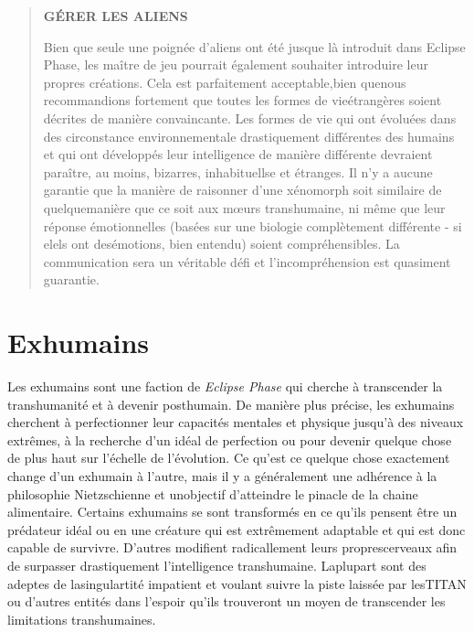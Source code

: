 \begin{quotation} \begin{large} \textbf{GÉRER LES ALIENS} \end{large} 

Bien que seule une poignée d'aliens ont été jusque là introduit dans Eclipse Phase, les maître de jeu pourrait également souhaiter introduire leur propres créations. Cela est parfaitement acceptable,bien quenous recommandions fortement que toutes les formes de vieétrangères soient décrites de manière convaincante. Les formes de vie qui ont évoluées dans des circonstance environnementale drastiquement différentes des humains et qui ont développés leur intelligence de manière différente devraient paraître, au moins, bizarres, inhabituellse et étranges. Il n'y a aucune garantie que la manière de raisonner d'une xénomorph  soit similaire de quelquemanière que ce soit aux mœurs transhumaine, ni même que leur réponse émotionnelles (basées sur une biologie complètement différente - si elels ont desémotions, bien entendu) soient compréhensibles. La communication sera un véritable défi et l'incompréhension est quasiment guarantie. \end{quotation} 

\section{Exhumains } 

Les exhumains sont une faction de \textit{Eclipse Phase} qui cherche à transcender la transhumanité et à devenir posthumain. De manière plus précise, les exhumains cherchent  à perfectionner leur capacités mentales et physique jusqu'à des niveaux extrêmes, à la recherche d'un idéal de perfection ou pour devenir quelque chose de plus haut sur l'échelle de l'évolution. Ce qu'est ce quelque chose exactement change d'un exhumain à l'autre, mais il y a généralement une adhérence à la philosophie Nietzschienne et unobjectif d'atteindre le pinacle de la chaine alimentaire. Certains exhumains se sont transformés en ce qu'ils pensent être un prédateur idéal ou en une créature qui est extrêmement adaptable et qui est donc capable de survivre. D'autres modifient radicallement leurs proprescerveaux afin de surpasser drastiquement l'intelligence transhumaine. Laplupart sont des adeptes de lasingulartité impatient et voulant suivre la piste laissée par lesTITAN ou d'autres entités dans l'espoir qu'ils trouveront un moyen de transcender les limitations transhumaines. 

